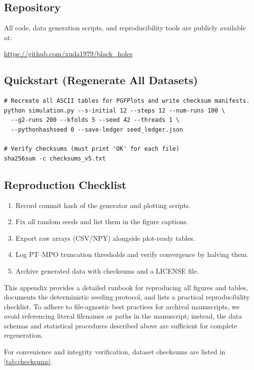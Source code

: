 \documentclass[11pt,a4paper]{article}
\theoremstyle{plain}
\theoremstyle{definition}
\theoremstyle{remark}
\begin{document}
\subsection{Repository}
All code, data generation scripts, and reproducibility tools are publicly available at:
\begin{center}
\url{https://github.com/xuda1979/black_holes}
\end{center}

\subsection{Quickstart (Regenerate All Datasets)}
\begin{verbatim}
# Recreate all ASCII tables for PGFPlots and write checksum manifests.
python simulation.py --s-initial 12 --steps 12 --num-runs 100 \
  --g2-runs 200 --kfolds 5 --seed 42 --threads 1 \
  --pythonhashseed 0 --save-ledger seed_ledger.json

# Verify checksums (must print 'OK' for each file)
sha256sum -c checksums_v5.txt
\end{verbatim}

\subsection{Reproduction Checklist}
\begin{enumerate}[label=(\alph*)]
  \item Record commit hash of the generator and plotting scripts.
  \item Fix all random seeds and list them in the figure captions.
  \item Export raw arrays (CSV/NPY) alongside plot-ready tables.
  \item Log PT--MPO truncation thresholds and verify convergence by halving them.
  \item Archive generated data with checksums and a LICENSE file.
\end{enumerate}

This appendix provides a detailed runbook for reproducing all figures and tables, documents the deterministic seeding protocol, and lists a practical reproducibility checklist. To adhere to file-agnostic best practices for archival manuscripts, we avoid referencing literal filenames or paths in the manuscript; instead, the data schemas and statistical procedures described above are sufficient for complete regeneration.

For convenience and integrity verification, dataset checksums are listed in \cref{tab:checksums}.
\end{document}
